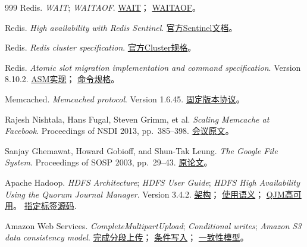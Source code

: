 \begin{thebibliography}{999}
Redis.
\textit{WAIT}; \textit{WAITAOF}.
\href{https://redis.io/docs/latest/commands/wait/}{WAIT}；
\href{https://redis.io/docs/latest/commands/waitaof/}{WAITAOF}。

Redis.
\textit{High availability with Redis Sentinel}.
\href{https://redis.io/docs/latest/operate/oss_and_stack/management/sentinel/}{官方Sentinel文档}。

Redis.
\textit{Redis cluster specification}.
\href{https://redis.io/docs/latest/operate/oss_and_stack/reference/cluster-spec/}{官方Cluster规格}。

Redis.
\textit{Atomic slot migration implementation and command specification}.
Version 8.10.2.
\href{https://github.com/redis/redis/blob/8.10.2/src/cluster_asm.c}{ASM实现}；
\href{https://github.com/redis/redis/blob/8.10.2/src/commands/cluster-migration.json}{命令规格}。

Memcached.
\textit{Memcached protocol}. Version 1.6.45.
\href{https://github.com/memcached/memcached/blob/1.6.45/doc/protocol.txt}{固定版本协议}。

Rajesh Nishtala, Hans Fugal, Steven Grimm, et al.
\textit{Scaling Memcache at Facebook}.
Proceedings of NSDI 2013, pp.\ 385--398.
\href{https://www.usenix.org/system/files/conference/nsdi13/nsdi13-final170_update.pdf}{会议原文}。

Sanjay Ghemawat, Howard Gobioff, and Shun-Tak Leung.
\textit{The Google File System}.
Proceedings of SOSP 2003, pp.\ 29--43.
\href{https://static.googleusercontent.com/media/research.google.com/en//archive/gfs-sosp2003.pdf}{原论文}。

Apache Hadoop.
\textit{HDFS Architecture}; \textit{HDFS User Guide}; \textit{HDFS High Availability Using the Quorum Journal Manager}.
Version 3.4.2.
\href{https://hadoop.apache.org/docs/r3.4.2/hadoop-project-dist/hadoop-hdfs/HdfsDesign.html}{架构}；
\href{https://hadoop.apache.org/docs/r3.4.2/hadoop-project-dist/hadoop-hdfs/HdfsUserGuide.html}{使用语义}；
\href{https://hadoop.apache.org/docs/r3.4.2/hadoop-project-dist/hadoop-hdfs/HDFSHighAvailabilityWithQJM.html}{QJM高可用}。
\href{https://github.com/apache/hadoop/tree/rel/release-3.4.2}{指定标签源码}.

Amazon Web Services.
\textit{CompleteMultipartUpload}; \textit{Conditional writes}; \textit{Amazon S3 data consistency model}.
\href{https://docs.aws.amazon.com/AmazonS3/latest/API/API_CompleteMultipartUpload.html}{完成分段上传}；
\href{https://docs.aws.amazon.com/AmazonS3/latest/userguide/conditional-writes.html}{条件写入}；
\href{https://docs.aws.amazon.com/AmazonS3/latest/userguide/Welcome.html#ConsistencyModel}{一致性模型}。


\end{thebibliography}
